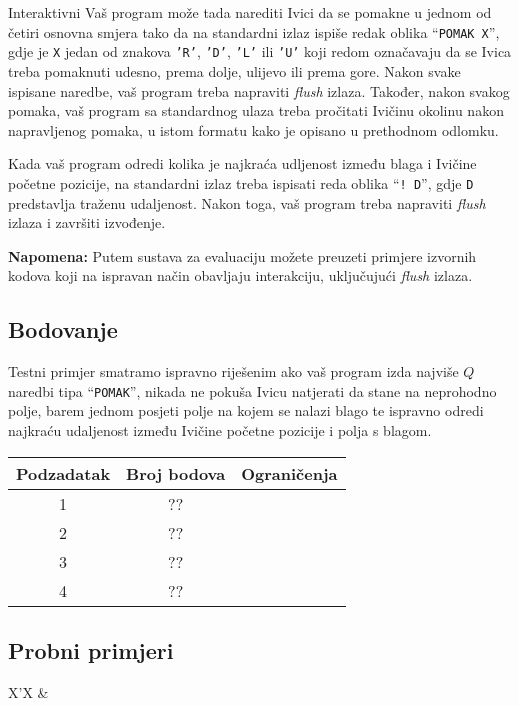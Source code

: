 \begin{statement}[
  problempoints=100,
  timelimit=1 sekunda,
  memorylimit=512 MiB,
]{Interaktivni}
Vaš program može tada narediti Ivici da se pomakne u jednom od četiri osnovna
smjera tako da na standardni izlaz ispiše redak oblika ``\texttt{POMAK X}'',
gdje je \texttt{X} jedan od znakova \texttt{'R'}, \texttt{'D'}, \texttt{'L'}
ili \texttt{'U'} koji redom označavaju da se Ivica treba pomaknuti udesno,
prema dolje, ulijevo ili prema gore. Nakon svake ispisane naredbe, vaš
program treba napraviti \textit{flush} izlaza. Također, nakon svakog pomaka,
vaš program sa standardnog ulaza treba pročitati Ivičinu okolinu nakon
napravljenog pomaka, u istom formatu kako je opisano u prethodnom odlomku.

Kada vaš program odredi kolika je najkraća udljenost između blaga i Ivičine
početne pozicije, na standardni izlaz treba ispisati reda oblika
``\texttt{\frenchspacing! D}'', gdje \texttt{D} predstavlja traženu
udaljenost. Nakon toga, vaš program treba napraviti \textit{flush} izlaza i
završiti izvođenje.

\textbf{Napomena:} Putem sustava za evaluaciju možete preuzeti primjere
izvornih kodova koji na ispravan način obavljaju interakciju, uključujući
\textit{flush} izlaza.

\subsection*{Bodovanje}
Testni primjer smatramo ispravno riješenim ako vaš program izda najviše $Q$
naredbi tipa ``\texttt{POMAK}'', nikada ne pokuša Ivicu natjerati da stane na
neprohodno polje, barem jednom posjeti polje na kojem se nalazi blago te
ispravno odredi najkraću udaljenost između Ivičine početne pozicije i polja s
blagom.

{\renewcommand{\arraystretch}{1.4}
  \setlength{\tabcolsep}{6pt}
  \begin{tabular}{ccl}
 Podzadatak & Broj bodova & Ograničenja \\ \midrule
  1 & ?? & \\
  2 & ?? & \\
  3 & ?? & \\
  4 & ?? & \\
\end{tabular}}

\subsection*{Probni primjeri}
\begin{tabularx}{\textwidth}{X'X}
 &
\end{tabularx}

\end{statement}

